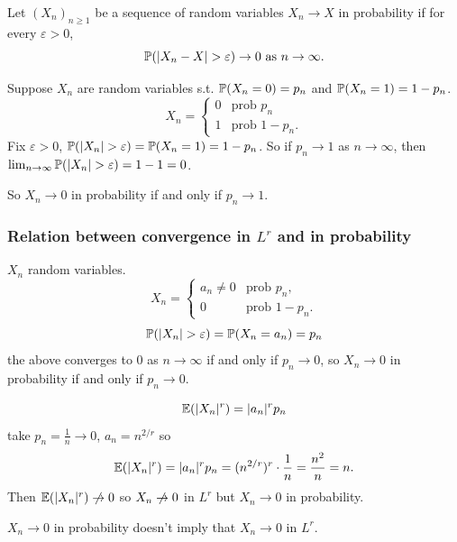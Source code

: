 \documentclass[10pt, a4paper]{article}
\begin{document}
\begin{definition}
    Let $(X_n)_{n \geq 1}$ be a sequence of random variables $X_n \to X$ in probability if for every $\varepsilon > 0$,
    \[
    \P(|X_n - X| > \varepsilon) \to 0\text{ as } n \to \infty.
    \]
\end{definition}

\begin{example}
    Suppose $X_n$ are random variables s.t.
    $\P(X_n = 0) = p_n$ and $\P(X_n = 1) = 1 - p_n$.
    \[
    X_n = \begin{cases}
        0 & \text{prob $p_n$} \\
        1 & \text{prob $1 - p_n$}.
    \end{cases}
    \]
    Fix $\varepsilon > 0$,
    $\P(|X_n| > \varepsilon) = \P(X_n = 1) = 1 - p_n$.
    So if $p_n \to 1$ as $n \to \infty$,
    then $\lim_{n \to \infty}\P(|X_n| > \varepsilon) = 1 - 1 = 0$.

    So $X_n \to 0$ in probability if and only if $p_n \to 1$.
\end{example}

\subsubsection{Relation between convergence in \texorpdfstring{$L ^ r$}{} and in probability}

\begin{example}
    $X_n$ random variables.
    \[
    X_n = \begin{cases}
        a_n \neq 0 &\text{prob $p_n$}, \\
        0 &\text{prob $1 - p_n$}.
    \end{cases}
    \]
    \[
    \P(|X_n| > \varepsilon) = \P(X_n = a_n) = p_n
    \]
    the above converges to $0$ as $n \to \infty$ if and only if $p_n \to 0$,
    so $X_n \to 0$ in probability if and only if $p_n \to 0$.

    \[
    \E(|X_n| ^ r) = |a_n| ^ rp_n
    \]
    take $p_n = \frac{1}{n} \to 0$,
    $a_n = n ^ {2 / r}$ so
    \[
    \E(|X_n| ^ r) = |a_n| ^ rp_n = (n ^ {2 / r}) ^ r \cdot \frac{1}{n} = \frac{n ^ 2}{n} = n.
    \]
    Then $\E(|X_n| ^ r) \centernot\to 0$ so $X_n \centernot\to 0$ in $L ^ r$ but $X_n \to 0$ in probability.
\end{example}

$X_n \to 0$ in probability doesn't imply that $X_n \to 0$ in $L ^ r$.
\end{document}
